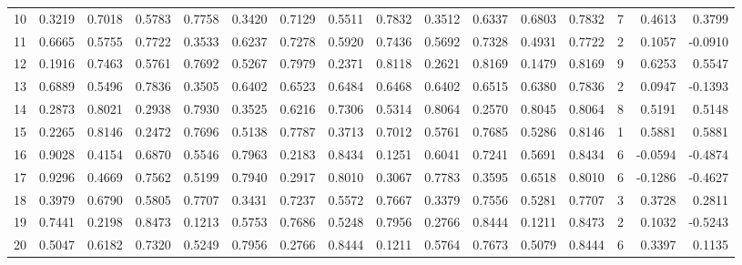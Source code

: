 \begin{tabular}{lrrrrrrrrrrrrrrr}
10  &      0.3219 &  0.7018 &  0.5783 &  0.7758 &  0.3420 &  0.7129 &  0.5511 &  0.7832 &  0.3512 &  0.6337 &   0.6803 &     0.7832 &      7 &                    0.4613 &                     0.3799 \\
11  &      0.6665 &  0.5755 &  0.7722 &  0.3533 &  0.6237 &  0.7278 &  0.5920 &  0.7436 &  0.5692 &  0.7328 &   0.4931 &     0.7722 &      2 &                    0.1057 &                    -0.0910 \\
12  &      0.1916 &  0.7463 &  0.5761 &  0.7692 &  0.5267 &  0.7979 &  0.2371 &  0.8118 &  0.2621 &  0.8169 &   0.1479 &     0.8169 &      9 &                    0.6253 &                     0.5547 \\
13  &      0.6889 &  0.5496 &  0.7836 &  0.3505 &  0.6402 &  0.6523 &  0.6484 &  0.6468 &  0.6402 &  0.6515 &   0.6380 &     0.7836 &      2 &                    0.0947 &                    -0.1393 \\
14  &      0.2873 &  0.8021 &  0.2938 &  0.7930 &  0.3525 &  0.6216 &  0.7306 &  0.5314 &  0.8064 &  0.2570 &   0.8045 &     0.8064 &      8 &                    0.5191 &                     0.5148 \\
15  &      0.2265 &  0.8146 &  0.2472 &  0.7696 &  0.5138 &  0.7787 &  0.3713 &  0.7012 &  0.5761 &  0.7685 &   0.5286 &     0.8146 &      1 &                    0.5881 &                     0.5881 \\
16  &      0.9028 &  0.4154 &  0.6870 &  0.5546 &  0.7963 &  0.2183 &  0.8434 &  0.1251 &  0.6041 &  0.7241 &   0.5691 &     0.8434 &      6 &                   -0.0594 &                    -0.4874 \\
17  &      0.9296 &  0.4669 &  0.7562 &  0.5199 &  0.7940 &  0.2917 &  0.8010 &  0.3067 &  0.7783 &  0.3595 &   0.6518 &     0.8010 &      6 &                   -0.1286 &                    -0.4627 \\
18  &      0.3979 &  0.6790 &  0.5805 &  0.7707 &  0.3431 &  0.7237 &  0.5572 &  0.7667 &  0.3379 &  0.7556 &   0.5281 &     0.7707 &      3 &                    0.3728 &                     0.2811 \\
19  &      0.7441 &  0.2198 &  0.8473 &  0.1213 &  0.5753 &  0.7686 &  0.5248 &  0.7956 &  0.2766 &  0.8444 &   0.1211 &     0.8473 &      2 &                    0.1032 &                    -0.5243 \\
20  &      0.5047 &  0.6182 &  0.7320 &  0.5249 &  0.7956 &  0.2766 &  0.8444 &  0.1211 &  0.5764 &  0.7673 &   0.5079 &     0.8444 &      6 &                    0.3397 &                     0.1135 \\

\end{tabular}
